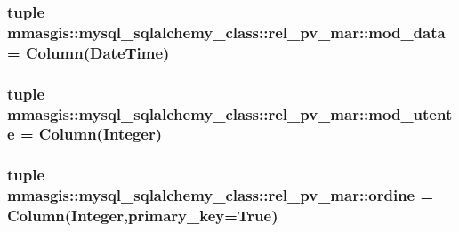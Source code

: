 \label{classmmasgis_1_1mysql__sqlalchemy__class_1_1rel__pv__mar_ab39ed823811ed880d467d92ff27adc73}
\hypertarget{classmmasgis_1_1mysql__sqlalchemy__class_1_1rel__pv__mar_ada2154b88331c2a3de1b09e8cf391d61}{
\subsubsection[{mod\_\-data}]{\setlength{\rightskip}{0pt plus 5cm}tuple {\bf mmasgis::mysql\_\-sqlalchemy\_\-class::rel\_\-pv\_\-mar::mod\_\-data} = Column(DateTime)}}
\label{classmmasgis_1_1mysql__sqlalchemy__class_1_1rel__pv__mar_ada2154b88331c2a3de1b09e8cf391d61}
\hypertarget{classmmasgis_1_1mysql__sqlalchemy__class_1_1rel__pv__mar_a577d313c49e770e98f2e9b39a57cd202}{
\subsubsection[{mod\_\-utente}]{\setlength{\rightskip}{0pt plus 5cm}tuple {\bf mmasgis::mysql\_\-sqlalchemy\_\-class::rel\_\-pv\_\-mar::mod\_\-utente} = Column(Integer)}}
\label{classmmasgis_1_1mysql__sqlalchemy__class_1_1rel__pv__mar_a577d313c49e770e98f2e9b39a57cd202}
\hypertarget{classmmasgis_1_1mysql__sqlalchemy__class_1_1rel__pv__mar_aa64e406aba066279966755f95b78c55b}{
\subsubsection[{ordine}]{\setlength{\rightskip}{0pt plus 5cm}tuple {\bf mmasgis::mysql\_\-sqlalchemy\_\-class::rel\_\-pv\_\-mar::ordine} = Column(Integer,primary\_\-key=True)}}
